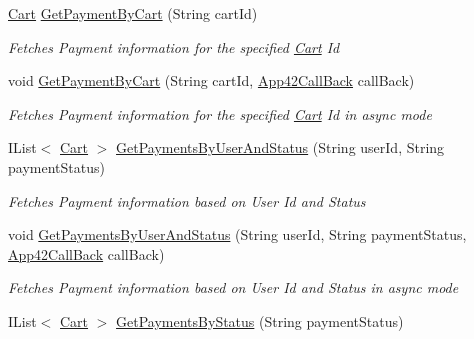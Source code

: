 \begin{DoxyCompactItemize}
\hyperlink{classcom_1_1shephertz_1_1app42_1_1paas_1_1sdk_1_1csharp_1_1shopping_1_1_cart}{Cart} \hyperlink{classcom_1_1shephertz_1_1app42_1_1paas_1_1sdk_1_1csharp_1_1shopping_1_1_cart_service_a84243a38626cd03af0476f5b437427f0}{Get\+Payment\+By\+Cart} (String cart\+Id)
\begin{DoxyCompactList}\small\item\em Fetches Payment information for the specified \hyperlink{classcom_1_1shephertz_1_1app42_1_1paas_1_1sdk_1_1csharp_1_1shopping_1_1_cart}{Cart} Id \end{DoxyCompactList}\item 
void \hyperlink{classcom_1_1shephertz_1_1app42_1_1paas_1_1sdk_1_1csharp_1_1shopping_1_1_cart_service_abbbfa358d9966556317ac8760e199f5e}{Get\+Payment\+By\+Cart} (String cart\+Id, \hyperlink{interfacecom_1_1shephertz_1_1app42_1_1paas_1_1sdk_1_1csharp_1_1_app42_call_back}{App42\+Call\+Back} call\+Back)
\begin{DoxyCompactList}\small\item\em Fetches Payment information for the specified \hyperlink{classcom_1_1shephertz_1_1app42_1_1paas_1_1sdk_1_1csharp_1_1shopping_1_1_cart}{Cart} Id in async mode \end{DoxyCompactList}\item 
I\+List$<$ \hyperlink{classcom_1_1shephertz_1_1app42_1_1paas_1_1sdk_1_1csharp_1_1shopping_1_1_cart}{Cart} $>$ \hyperlink{classcom_1_1shephertz_1_1app42_1_1paas_1_1sdk_1_1csharp_1_1shopping_1_1_cart_service_af7b1cd76a0267f8d0a53cec657a822d7}{Get\+Payments\+By\+User\+And\+Status} (String user\+Id, String payment\+Status)
\begin{DoxyCompactList}\small\item\em Fetches Payment information based on User Id and Status \end{DoxyCompactList}\item 
void \hyperlink{classcom_1_1shephertz_1_1app42_1_1paas_1_1sdk_1_1csharp_1_1shopping_1_1_cart_service_aaf0568c8ffa9c15759a4841525c7b436}{Get\+Payments\+By\+User\+And\+Status} (String user\+Id, String payment\+Status, \hyperlink{interfacecom_1_1shephertz_1_1app42_1_1paas_1_1sdk_1_1csharp_1_1_app42_call_back}{App42\+Call\+Back} call\+Back)
\begin{DoxyCompactList}\small\item\em Fetches Payment information based on User Id and Status in async mode \end{DoxyCompactList}\item 
I\+List$<$ \hyperlink{classcom_1_1shephertz_1_1app42_1_1paas_1_1sdk_1_1csharp_1_1shopping_1_1_cart}{Cart} $>$ \hyperlink{classcom_1_1shephertz_1_1app42_1_1paas_1_1sdk_1_1csharp_1_1shopping_1_1_cart_service_aa72a88e5b1ee66970b2fc4363175db7b}{Get\+Payments\+By\+Status} (String payment\+Status)

\end{DoxyCompactItemize}
